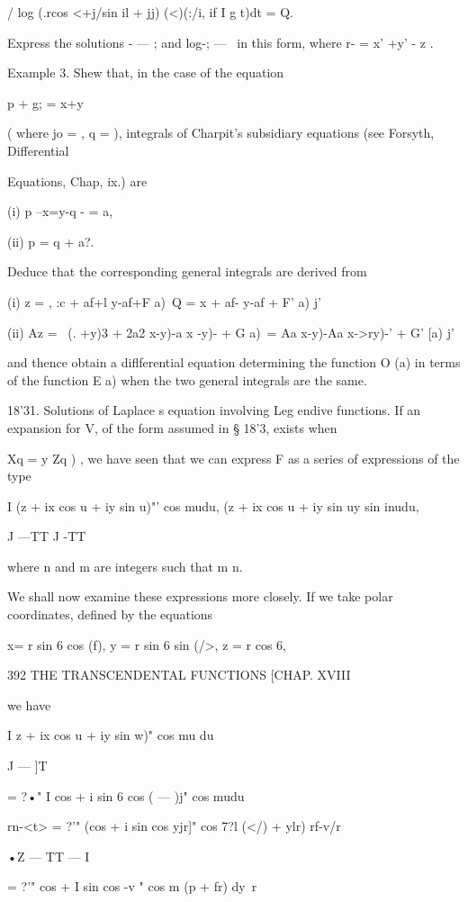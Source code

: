 / log (.rcos <+j/sin il + jj) (<)(:/i, if I g t)dt = Q.

Express the solutions - — ; and log-; — \ in this form, where r- = x'
+y' - z .

Example 3. Shew that, in the case of the equation

p + g; = x+y

( where jo = , q = ), integrals of Charpit's subsidiary equations (see
Forsyth, Differential

Equations, Chap, ix.) are

(i) p --x=y-q - = a,

(ii) p = q + a?.

Deduce that the corresponding general integrals are derived from

(i) z = , :c + af+l y-af+F a)\ Q = x + af- y-af + F' a) j'

(ii) Az = \ (. +y)3 + 2a2 x-y)-a x -y)- + G a)\ = Aa x-y)-Aa x->ry)-'
+ G' [a) j'

and thence obtain a diflferential equation determining the function O
(a) in terms of the function E a) when the two general integrals are
the same.

18'31. Solutions of Laplace s equation involving Leg endive functions.
If an expansion for V, of the form assumed in § 18'3, exists when

Xq = y Zq ) , we have seen that we can express F as a series of
expressions of the type

I (z + ix cos u + iy sin u)"' cos mudu, (z + ix cos u + iy sin uy sin
inudu,

J —TT J -TT

where n and m are integers such that m n.

We shall now examine these expressions more closely. If we take polar
coordinates, defined by the equations

x= r sin 6 cos (f), y = r sin 6 sin (/>, z = r cos 6,



392 THE TRANSCENDENTAL FUNCTIONS [CHAP. XVIII

we have

I z + ix cos u + iy sin w)" cos mu du

J — ]T

= ?•" I cos + i sin 6 cos ( — )j" cos mudu

rn-<t> = ?'" (cos + i sin cos yjr]" cos 7?l (</) + ylr) rf-v/r

•Z — TT — I

= ?'" cos + I sin cos -v " cos m (p + fr) dy\ r

